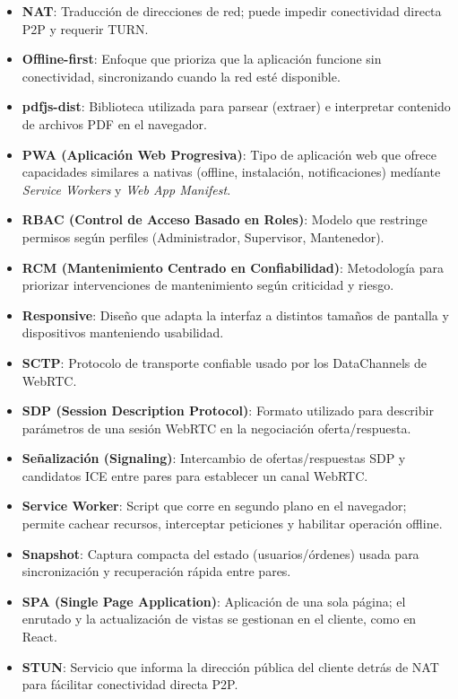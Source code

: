 \documentclass[10pt,a4paper]{report}
\begin{document}
\begin{itemize}
    \item \textbf{NAT}: Traducción de direcciones de red; puede impedir conectividad directa P2P y requerir TURN.
    \item \textbf{Offline-first}: Enfoque que prioriza que la aplicación funcione sin conectividad, sincronizando cuando la red esté disponible.
    \item \textbf{pdfjs-dist}: Biblioteca utilizada para parsear (extraer) e interpretar contenido de archivos PDF en el navegador.
    \item \textbf{PWA (Aplicación Web Progresiva)}: Tipo de aplicación web que ofrece capacidades similares a nativas (offline, instalación, notificaciones) medíante \textit{Service Workers} y \textit{Web App Manifest}.
    \item \textbf{RBAC (Control de Acceso Basado en Roles)}: Modelo que restringe permisos según perfiles (Administrador, Supervisor, Mantenedor).
    \item \textbf{RCM (Mantenimiento Centrado en Confiabilidad)}: Metodología para priorizar intervenciones de mantenimiento según criticidad y riesgo.
    \item \textbf{Responsive}: Diseño que adapta la interfaz a distintos tamaños de pantalla y dispositivos manteniendo usabilidad.
    \item \textbf{SCTP}: Protocolo de transporte confiable usado por los DataChannels de WebRTC.
    \item \textbf{SDP (Session Description Protocol)}: Formato utilizado para describir parámetros de una sesión WebRTC en la negociación oferta/respuesta.
    \item \textbf{Señalización (Signaling)}: Intercambio de ofertas/respuestas SDP y candidatos ICE entre pares para establecer un canal WebRTC.
    \item \textbf{Service Worker}: Script que corre en segundo plano en el navegador; permite cachear recursos, interceptar peticiones y habilitar operación offline.
    \item \textbf{Snapshot}: Captura compacta del estado (usuarios/órdenes) usada para sincronización y recuperación rápida entre pares.
    \item \textbf{SPA (Single Page Application)}: Aplicación de una sola página; el enrutado y la actualización de vistas se gestionan en el cliente, como en React.
    \item \textbf{STUN}: Servicio que informa la dirección pública del cliente detrás de NAT para fácilitar conectividad directa P2P.

\end{itemize}
\end{document}
